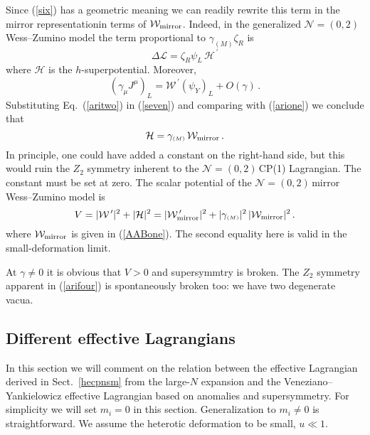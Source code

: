 \documentclass[epsfig,12pt]{article}
\def\beq{\begin{equation}}
\def\eeq{\end{equation}}
\newcommand{\nzt}{${\mathcal N}=(0,2)\,$}
\newcommand{\cell}{{\mathcal L}}
\newcommand{\cw}{{\mathcal W}}
\def\beq{\begin{equation}}
\def\eeq{\end{equation}}
\newcommand{\ssm}{{\scriptscriptstyle(M)}}
\begin{document}
{Since (\ref{six}) has a geometric meaning we can readily rewrite this term in the mirror representationin terms of 
${\mathcal W}_{\rm mirror}$.
 Indeed, in the generalized \nzt Wess--Zumino model the term proportional to $\gamma_\ssm \zeta_R$ is
 \cite{SYneww}
 \beq
 \Delta\cell = \zeta_R \psi_L\,{\mathcal H}^{\,\prime}
 \label{arione}
 \eeq
 where ${\mathcal H}$ is the $h$-superpotential. Moreover,
 \beq
 \left(\gamma_\mu J^\mu\right)_L = {\mathcal W}^{\,\prime} \left(\psi_Y\right)_{L} +O(\gamma)\,.
  \label{aritwo}
 \eeq
Substituting Eq.~(\ref{aritwo}) in (\ref{seven}) and comparing with (\ref{arione}) we conclude that
\beq
{\mathcal H} = \gamma_\ssm\,{\mathcal W}_{\rm mirror}\,.
  \label{arithree}
 \eeq
 In principle, one could have added a constant on the right-hand side, but this would ruin the $Z_2$ 
 symmetry inherent to the \nzt CP(1) Lagrangian. The constant must be set at zero. 
 The scalar potential of the \nzt mirror Wess--Zumino model 
  is \cite{SYneww}
 \beq
 V= |\cw^{\,\prime} |^2+|\mathcal H|^2 = |\cw^{\,\prime}_{\rm mirror} |^2 +|\gamma_\ssm |^2\,|\cw_{\rm mirror} |^2\,.
   \label{arifour}
 \eeq
 where $\cw_{\rm mirror} $ is given in (\ref{AABone}).
 The second equality here is valid in the small-deformation limit.
 
At $\gamma \neq 0$ it is obvious that $V>0$ and supersymmtry is broken.
The $Z_2$ symmetry apparent in (\ref{arifour}) is spontaneously broken too:
we have two degenerate vacua.



\subsection{Different effective Lagrangians}
\label{defefl}

In this section we will comment on the relation between the
effective Lagrangian derived in Sect.~\ref{hecpnsm} from the large-$N$ expansion
 and the Veneziano--Yankielowicz
effective Lagrangian based on  anomalies and supersymmetry.
For simplicity we will set $m_i =0$ in this section. 
Generalization to  $m_i \neq 0$ is straightforward. We  assume the heterotic deformation to be small, $u\ll1$.

}
\end{document}
